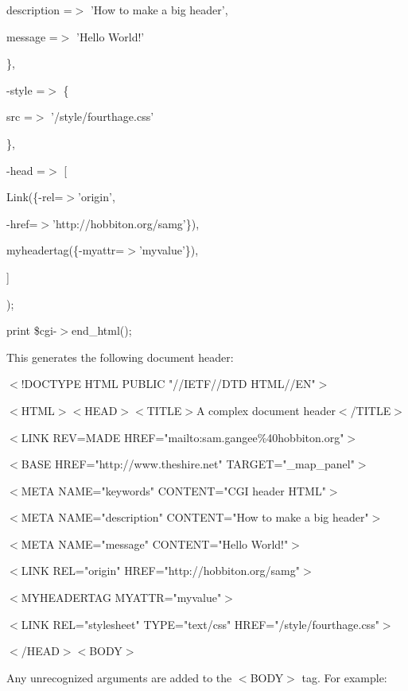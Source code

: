 \documentclass[a4paper,11pt]{book}
\begin{document}
\noindent description =$>$ 'How to make a big header',

\noindent message =$>$ 'Hello World!'

\noindent \},

\noindent -style =$>$ \{

\noindent src =$>$ '/style/fourthage.css'

\noindent \},

\noindent -head =$>$ [

\noindent Link(\{-rel=$>$'origin',

\noindent -href=$>$'http://hobbiton.org/samg'\}),

\noindent myheadertag(\{-myattr=$>$'myvalue'\}),

\noindent ]

\noindent );

\noindent print \$cgi-$>$end\_html();

\noindent 

\noindent This generates the following document header:

\noindent 

\noindent $<$!DOCTYPE HTML PUBLIC "//IETF//DTD HTML//EN"$>$

\noindent $<$HTML$>$$<$HEAD$>$$<$TITLE$>$A complex document header$<$/TITLE$>$

\noindent $<$LINK REV=MADE HREF="mailto:sam.gangee\%40hobbiton.org"$>$

\noindent $<$BASE HREF="http://www.theshire.net" TARGET="\_map\_panel"$>$

\noindent $<$META NAME="keywords" CONTENT="CGI header HTML"$>$

\noindent 

\noindent 

\noindent $<$META NAME="description" CONTENT="How to make a big header"$>$

\noindent $<$META NAME="message" CONTENT="Hello World!"$>$

\noindent $<$LINK REL="origin" HREF="http://hobbiton.org/samg"$>$

\noindent $<$MYHEADERTAG MYATTR="myvalue"$>$

\noindent $<$LINK REL="stylesheet" TYPE="text/css" HREF="/style/fourthage.css"$>$

\noindent $<$/HEAD$>$$<$BODY$>$

\noindent 

\noindent Any unrecognized arguments are added to the $<$BODY$>$ tag. For example:

\noindent 
\end{document}
